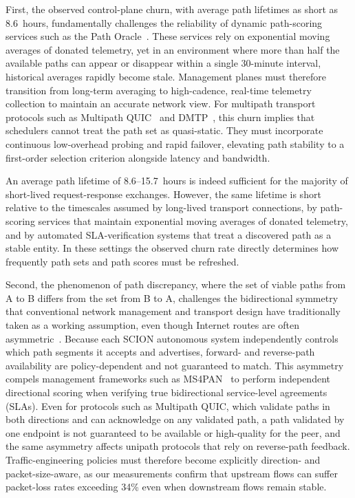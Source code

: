 \documentclass[pdflatex,sn-vancouver-num]{sn-jnl}%
\theoremstyle{thmstyleone}%
\theoremstyle{thmstyletwo}%
\theoremstyle{thmstylethree}%
\begin{document}
First, the observed control-plane churn, with average path lifetimes as short as 8.6~hours, fundamentally challenges the reliability of dynamic path-scoring services such as the Path Oracle~\cite{kruger2023path}. These services rely on exponential moving averages of donated telemetry, yet in an environment where more than half the available paths can appear or disappear within a single 30-minute interval, historical averages rapidly become stale. Management planes must therefore transition from long-term averaging to high-cadence, real-time telemetry collection to maintain an accurate network view. For multipath transport protocols such as Multipath QUIC~\cite{ietf-quic-multipath-15} and DMTP~\cite{john2023dmtp}, this churn implies that schedulers cannot treat the path set as quasi-static. They must incorporate continuous low-overhead probing and rapid failover, elevating path stability to a first-order selection criterion alongside latency and bandwidth.

An average path lifetime of 8.6--15.7~hours is indeed sufficient for the majority of short-lived request-response exchanges. However, the same lifetime is short relative to the timescales assumed by long-lived transport connections, by path-scoring services that maintain exponential moving averages of donated telemetry, and by automated SLA-verification systems that treat a discovered path as a stable entity. In these settings the observed churn rate directly determines how frequently path sets and path scores must be refreshed.

Second, the phenomenon of path discrepancy, where the set of viable paths from A to B differs from the set from B to A, challenges the bidirectional symmetry that conventional network management and transport design have traditionally taken as a working assumption, even though Internet routes are often asymmetric~\cite{paxson1997end}. Because each SCION autonomous system independently controls which path segments it accepts and advertises, forward- and reverse-path availability are policy-dependent and not guaranteed to match. This asymmetry compels management frameworks such as MS4PAN~\cite{boldrini2024ms4pan} to perform independent directional scoring when verifying true bidirectional service-level agreements (SLAs). Even for protocols such as Multipath QUIC, which validate paths in both directions and can acknowledge on any validated path, a path validated by one endpoint is not guaranteed to be available or high-quality for the peer, and the same asymmetry affects unipath protocols that rely on reverse-path feedback. Traffic-engineering policies must therefore become explicitly direction- and packet-size-aware, as our measurements confirm that upstream flows can suffer packet-loss rates exceeding 34\% even when downstream flows remain stable.
\end{document}
